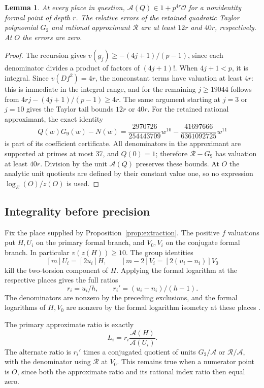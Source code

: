 \documentclass[11pt,a4paper]{article}
\newtheorem{lemma}[theorem]{Lemma}
\theoremstyle{remark}\newtheorem{remark}[theorem]{Remark}
\begin{document}
\begin{lemma}\label{lem:logerror}
At every place in question,
$\mathcal A(Q)\in1+p^{4r}\mathcal O$ for a nonidentity formal point
of depth $r$. The relative errors of the retained quadratic Taylor
polynomial $G_2$ and rational approximant $\mathcal R$ are at least
$12r$ and $40r$, respectively. At $O$ the errors are zero.
\end{lemma}
\begin{proof}
The recursion gives $v(g_j)\ge-(4j+1)/(p-1)$, since each denominator
divides a product of factors of $(4j+1)!$. When $4j+1<p$, it is
integral. Since $v(Df^2)=4r$, the nonconstant terms have valuation
at least $4r$: this is immediate in the integral range, and for the
remaining $j\ge19044$ follows from
$4rj-(4j+1)/(p-1)\ge4r$.
The same argument starting at $j=3$ or $j=10$ gives the Taylor tail
bounds $12r$ or $40r$.
For the retained rational approximant, the exact identity
\[
 Q(w)G_9(w)-N(w)
 =\frac{2970726}{254443709}w^{10}
 -\frac{41697666}{6361092725}w^{11}
\]
is part of its coefficient certificate. All denominators in the
approximant are supported at primes at most 37, and $Q(0)=1$;
therefore $\mathcal R-G_9$ has valuation at least $40r$.
Division by the unit $\mathcal A(Q)$ preserves these bounds.
At $O$ the analytic unit quotients are defined by their constant
value one, so no expression $\log_E(O)/z(O)$ is used.
\end{proof}

\subsection{Integrality before precision}
Fix the place supplied by Proposition~\ref{prop:extraction}. The
positive $f$ valuations put $H,U_i$ on the primary formal branch,
and $V_0,V_i$ on the conjugate formal branch. In particular
$v(z(H))\ge10$. The group identities
\[
 [m]U_i=[2u_i]H,\qquad
 [m-2]V_i=[2(u_i-n_i)]V_0
\]
kill the two-torsion component of $H$. Applying the formal logarithm
at the respective places gives the full ratios
\[
               r_i=u_i/h,\qquad r_i'=(u_i-n_i)/(h-1).
\]
The denominators are nonzero by the preceding exclusions, and the
formal logarithms of $H,V_0$ are nonzero by the formal logarithm
isometry at these places \cite[Theorem IV.6.4]{Silverman}.

The primary approximate ratio is exactly
\[
 L_i=r_i\frac{\mathcal A(H)}{\mathcal A(U_i)}.
\]
The alternate ratio is $r_i'$ times a conjugated quotient of units
$G_2/\mathcal A$ or $\mathcal R/\mathcal A$, with the denominator
using $\mathcal R$ at $V_0$. This remains true when a numerator point
is $O$, since both the approximate ratio and its rational index ratio
then equal zero.
\end{document}
